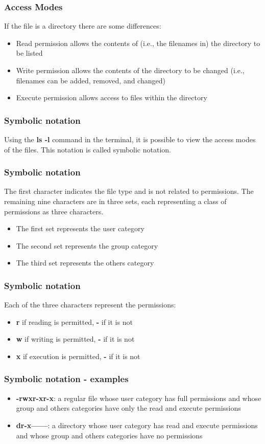 \documentclass{beamer}
\begin{document}
\begin{frame}
\frametitle{Access Modes}
If the file is a directory there are some differences:
\begin{itemize}
\item Read permission allows the contents of (i.e., the filenames in) the directory to be listed
\item Write permission allows the contents of the directory to be changed (i.e., filenames can be added, removed, and changed)
\item Execute permission allows access to files within the directory
\end{itemize}
\end{frame}

\begin{frame}
\frametitle{Symbolic notation}
Using the \textbf{ls -l} command in the terminal, it is possible to view the access modes of the files. This notation is called \alert{symbolic notation}.
\end{frame}

\begin{frame}
\frametitle{Symbolic notation}
The first character indicates the file type and is not related to permissions. The remaining nine characters are in three sets, each representing a class of permissions as three characters. 
\begin{itemize}
\item The first set represents the user category
\item The second set represents the group category
\item  The third set represents the others category
\end{itemize}
\end{frame}

\begin{frame}
\frametitle{Symbolic notation}
Each of the three characters represent the permissions:
\begin{itemize}
\item \textbf{r} if reading is permitted, \textbf{-} if it is not
\item \textbf{w} if writing is permitted, \textbf{-} if it is not
\item \textbf{x} if execution is permitted, \textbf{-} if it is not
\end{itemize}
\end{frame}

\begin{frame}
\frametitle{Symbolic notation - examples}
\begin{example}
\begin{itemize}
\item \textbf{-rwxr-xr-x}: a regular file whose user category has full permissions and whose group and others categories have only the read and execute permissions
\item \textbf{dr-x------}: a directory whose user category has read and execute permissions and whose group and others categories have no permissions
\end{itemize}
\end{example}
\end{frame}
\end{document}
